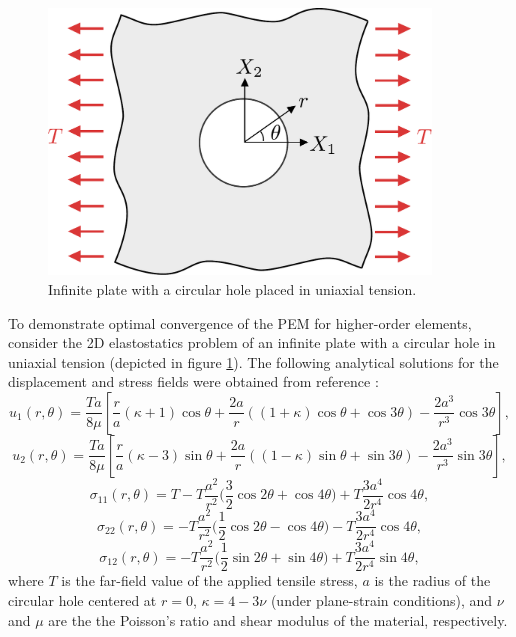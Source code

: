 \begin{figure}[!h]
  \centering
  \includegraphics[width=4.0in]{figures/plate_with_hole.pdf}  \caption{Infinite plate with a circular hole placed in uniaxial tension.}
  \label{fig:plate_with_hole_problem}
\end{figure}
To demonstrate optimal convergence of the PEM for higher-order elements, consider the 2D elastostatics problem of an infinite plate with a circular hole in uniaxial tension (depicted in figure \ref{fig:plate_with_hole_problem}). The following analytical solutions for the displacement and stress fields were obtained from reference \cite{Wikiversity:17}:
\begin{equation}
  u_1 (r,\theta) = \frac{Ta}{8\mu} \left[ \frac{r}{a} (\kappa + 1) \cos \theta + \frac{2a}{r} ((1+\kappa) \cos \theta + \cos 3 \theta) - \frac{2a^3}{r^3} \cos 3 \theta \right],
\end{equation}
\begin{equation}
  u_2 (r,\theta) = \frac{Ta}{8\mu} \left[ \frac{r}{a} (\kappa - 3) \sin \theta + \frac{2a}{r} ((1-\kappa) \sin \theta + \sin 3 \theta) - \frac{2a^3}{r^3} \sin 3 \theta \right],
\end{equation}
\begin{equation}
  \sigma_{11} (r, \theta) = T - T \frac{a^2}{r^2} \bigg( \frac{3}{2} \cos 2 \theta + \cos 4 \theta \bigg) + T \frac{3a^4}{2r^4} \cos 4 \theta,
\end{equation}
\begin{equation}
  \sigma_{22} (r, \theta) = - T \frac{a^2}{r^2} \bigg( \frac{1}{2} \cos 2 \theta - \cos 4 \theta \bigg) - T \frac{3a^4}{2r^4} \cos 4 \theta,
\end{equation}
\begin{equation}
  \sigma_{12} (r, \theta) = - T \frac{a^2}{r^2} \bigg( \frac{1}{2} \sin 2 \theta + \sin 4 \theta \bigg) + T \frac{3a^4}{2r^4} \sin 4 \theta,
\end{equation}
where $T$ is the far-field value of the applied tensile stress, $a$ is the radius of the circular hole centered at $r=0$, $\kappa = 4 - 3\nu$ (under plane-strain conditions), and $\nu$ and $\mu$ are the the Poisson's ratio and shear modulus of the material, respectively.

